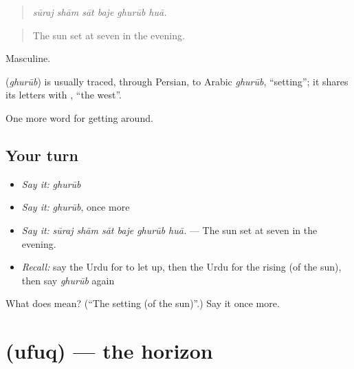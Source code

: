 \begin{quote}
     
\end{quote}

\begin{quote}
\emph{sūraj shām sāt baje ghurūb huā.}
\end{quote}

\begin{quote}
The sun set at seven in the evening.
\end{quote}

Masculine.

\begin{cousinweb}
\textbf{} (\emph{ghurūb}) is usually traced, through Persian, to Arabic \emph{ghurūb}, \textquotedblleft{}setting\textquotedblright{}; it shares its letters with \textbf{}, \textquotedblleft{}the west\textquotedblright{}.
\end{cousinweb}

\begin{grammarlens}[title={What you've built}]
One more word for getting around.
\end{grammarlens}

\subsection*{Your turn}
\begin{itemize}
\raggedright
  \item \emph{Say it:} \emph{ghurūb}
  \item \emph{Say it:} \emph{ghurūb}, once more
  \item \emph{Say it:} \emph{sūraj shām sāt baje ghurūb huā.} — The sun set at seven in the evening.
  \item \emph{Recall:} say the Urdu for to let up, then the Urdu for the rising (of the sun), then say \emph{ghurūb} again
\end{itemize}

\begin{tcolorbox}[breakable,colback=teal!4,colframe=teal!35!black,title={Before you move on}]
What does  mean? (\textquotedblleft{}The setting (of the sun)\textquotedblright{}.) Say it once more.
\end{tcolorbox}
\section[\texorpdfstring{\ur{افق} (ufuq)}{افق (ufuq)}]{ (ufuq) — the horizon}

